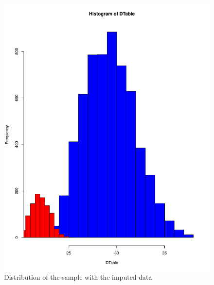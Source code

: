 \documentclass[10pt,a4paper]{article}
\begin{document}
\begin{enumerate}
\begin{figure}
\includegraphics[scale=0.3]{Hist2.pdf}
\caption{Distribution of the sample with the imputed data}
\label{fig-3}
\end{figure}
\begin{figure}

\end{figure}
\end{enumerate}
\end{document}

